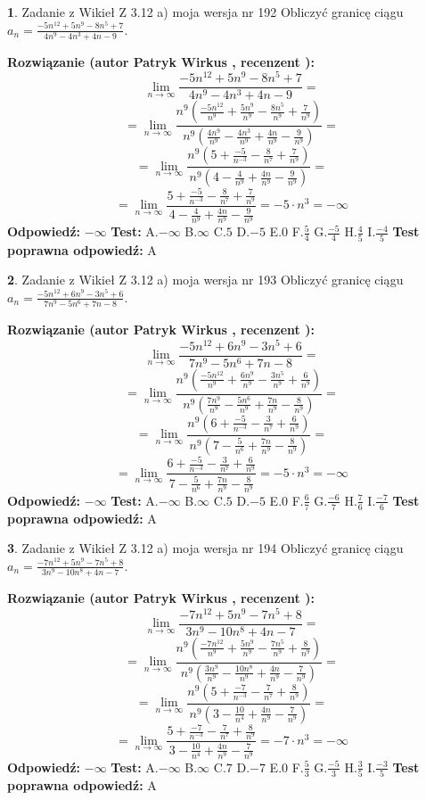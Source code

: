\documentclass[12pt, a4paper]{article}
\theoremstyle{definition} %
\newtheorem{zad}{}
\newcommand{\zadStart}[1]{\begin{zad}#1\newline}
\newcommand{\zadStop}{\end{zad}}
\newcommand{\rozwStart}[2]{\noindent \textbf{Rozwiązanie (autor #1 , recenzent #2): }\newline}
\newcommand{\rozwStop}{\newline}
\newcommand{\odpStart}{\noindent \textbf{Odpowiedź:}\newline}
\newcommand{\odpStop}{\newline}
\newcommand{\testStart}{\noindent \textbf{Test:}\newline}
\newcommand{\testStop}{\newline}
\newcommand{\kluczStart}{\noindent \textbf{Test poprawna odpowiedź:}\newline}
\newcommand{\kluczStop}{\newline}
\begin{document}
\zadStart{Zadanie z Wikieł Z 3.12 a) moja wersja nr 192}
Obliczyć granicę ciągu $a_{n}=\frac{-5n^{12}+5n^{9}-8n^{5}+7}{4n^{9}-4n^{3}+4n-9}$.
\zadStop
\rozwStart{Patryk Wirkus}{}
$$\lim\limits_{n\to\infty}\frac{-5n^{12}+5n^{9}-8n^{5}+7}{4n^{9}-4n^{3}+4n-9}=$$
$$=\lim\limits_{n\to\infty}\frac{n^{9}\left(\frac{-5n^{12}}{n^{9}}+\frac{5n^{9}}{n^{9}}-\frac{8n^{5}}{n^{9}}+\frac{7}{n^{9}}\right)}{n^{9}\left(\frac{4n^{9}}{n^{9}}-\frac{4n^{3}}{n^{9}}+\frac{4n}{n^{9}}-\frac{9}{n^{9}}\right)}=$$
$$=\lim\limits_{n\to\infty}\frac{n^{9}\left(5+\frac{-5}{n^{-3}}-\frac{8}{n^{7}}+\frac{7}{n^{9}}\right)}
{n^{9}\left(4-\frac{4}{n^{9}}+\frac{4n}{n^{9}}-\frac{9}{n^{9}}\right)}=$$
$$=\lim\limits_{n\to\infty}\frac{5+\frac{-5}{n^{-3}}-\frac{8}{n^{7}}+\frac{7}{n^{9}}}{4-\frac{4}{n^{9}}+\frac{4n}{n^{9}}-\frac{9}{n^{9}}}=-5\cdot n^{3} = -\infty$$
\rozwStop
\odpStart
$-\infty$
\odpStop
\testStart
A.$-\infty$
B.$\infty$
C.$5$
D.$-5$
E.$0$
F.$\frac{5}{4}$
G.$\frac{-5}{4}$
H.$\frac{4}{5}$
I.$\frac{-4}{5}$
\testStop
\kluczStart
A
\kluczStop



\zadStart{Zadanie z Wikieł Z 3.12 a) moja wersja nr 193}
Obliczyć granicę ciągu $a_{n}=\frac{-5n^{12}+6n^{9}-3n^{5}+6}{7n^{9}-5n^{6}+7n-8}$.
\zadStop
\rozwStart{Patryk Wirkus}{}
$$\lim\limits_{n\to\infty}\frac{-5n^{12}+6n^{9}-3n^{5}+6}{7n^{9}-5n^{6}+7n-8}=$$
$$=\lim\limits_{n\to\infty}\frac{n^{9}\left(\frac{-5n^{12}}{n^{9}}+\frac{6n^{9}}{n^{9}}-\frac{3n^{5}}{n^{9}}+\frac{6}{n^{9}}\right)}{n^{9}\left(\frac{7n^{9}}{n^{9}}-\frac{5n^{6}}{n^{9}}+\frac{7n}{n^{9}}-\frac{8}{n^{9}}\right)}=$$
$$=\lim\limits_{n\to\infty}\frac{n^{9}\left(6+\frac{-5}{n^{-3}}-\frac{3}{n^{7}}+\frac{6}{n^{9}}\right)}
{n^{9}\left(7-\frac{5}{n^{6}}+\frac{7n}{n^{9}}-\frac{8}{n^{9}}\right)}=$$
$$=\lim\limits_{n\to\infty}\frac{6+\frac{-5}{n^{-3}}-\frac{3}{n^{7}}+\frac{6}{n^{9}}}{7-\frac{5}{n^{6}}+\frac{7n}{n^{9}}-\frac{8}{n^{9}}}=-5\cdot n^{3} = -\infty$$
\rozwStop
\odpStart
$-\infty$
\odpStop
\testStart
A.$-\infty$
B.$\infty$
C.$5$
D.$-5$
E.$0$
F.$\frac{6}{7}$
G.$\frac{-6}{7}$
H.$\frac{7}{6}$
I.$\frac{-7}{6}$
\testStop
\kluczStart
A
\kluczStop



\zadStart{Zadanie z Wikieł Z 3.12 a) moja wersja nr 194}
Obliczyć granicę ciągu $a_{n}=\frac{-7n^{12}+5n^{9}-7n^{5}+8}{3n^{9}-10n^{8}+4n-7}$.
\zadStop
\rozwStart{Patryk Wirkus}{}
$$\lim\limits_{n\to\infty}\frac{-7n^{12}+5n^{9}-7n^{5}+8}{3n^{9}-10n^{8}+4n-7}=$$
$$=\lim\limits_{n\to\infty}\frac{n^{9}\left(\frac{-7n^{12}}{n^{9}}+\frac{5n^{9}}{n^{9}}-\frac{7n^{5}}{n^{9}}+\frac{8}{n^{9}}\right)}{n^{9}\left(\frac{3n^{9}}{n^{9}}-\frac{10n^{8}}{n^{9}}+\frac{4n}{n^{9}}-\frac{7}{n^{9}}\right)}=$$
$$=\lim\limits_{n\to\infty}\frac{n^{9}\left(5+\frac{-7}{n^{-3}}-\frac{7}{n^{7}}+\frac{8}{n^{9}}\right)}
{n^{9}\left(3-\frac{10}{n^{4}}+\frac{4n}{n^{9}}-\frac{7}{n^{9}}\right)}=$$
$$=\lim\limits_{n\to\infty}\frac{5+\frac{-7}{n^{-3}}-\frac{7}{n^{7}}+\frac{8}{n^{9}}}{3-\frac{10}{n^{4}}+\frac{4n}{n^{9}}-\frac{7}{n^{9}}}=-7\cdot n^{3} = -\infty$$
\rozwStop
\odpStart
$-\infty$
\odpStop
\testStart
A.$-\infty$
B.$\infty$
C.$7$
D.$-7$
E.$0$
F.$\frac{5}{3}$
G.$\frac{-5}{3}$
H.$\frac{3}{5}$
I.$\frac{-3}{5}$
\testStop
\kluczStart
A
\kluczStop
\end{document}
